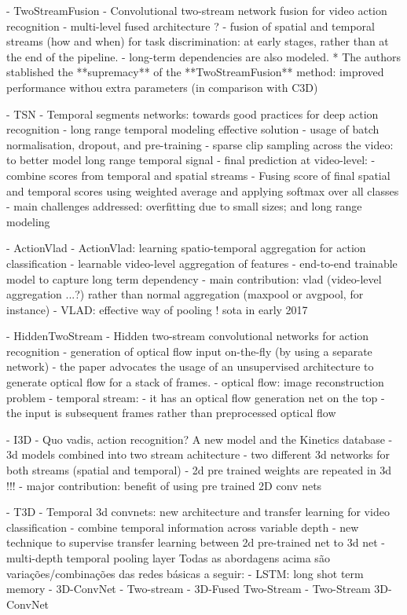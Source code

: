   - TwoStreamFusion
    - Convolutional two-stream network fusion for video action recognition
      - multi-level fused architecture ?
      - fusion of spatial and temporal streams (how and when) for task discrimination: at early stages, rather than at the end of the pipeline.
      - long-term dependencies are also modeled.
      * The authors stablished the **supremacy** of the **TwoStreamFusion** method: improved performance withou extra parameters (in comparison with C3D)

  - TSN
    - Temporal segments networks: towards good practices for deep action recognition
      - long range temporal modeling effective solution
      - usage of batch normalisation, dropout, and pre-training
      - sparse clip sampling across the video: to better model long range temporal signal
      - final prediction at video-level: 
        - combine scores from temporal and spatial streams
        - Fusing score of final spatial and temporal scores using weighted average and applying softmax over all classes
      - main challenges addressed: overfitting due to small sizes; and long range modeling

  - ActionVlad
    - ActionVlad: learning spatio-temporal aggregation for action classification
      - learnable video-level aggregation of features
      - end-to-end trainable model to capture long term dependency
      - main contribution: vlad (video-level aggregation ...?) rather than normal aggregation (maxpool or avgpool, for instance)
      - VLAD: effective way of pooling ! sota in early 2017

  - HiddenTwoStream
    - Hidden two-stream convolutional networks for action recognition
      - generation of optical flow input on-the-fly (by using a separate network)
      - the paper advocates the usage of an unsupervised architecture to generate optical flow for a stack of frames.
      - optical flow: image reconstruction problem
      - temporal stream:
        - it has an optical flow generation net on the top
        - the input is subsequent frames rather than preprocessed optical flow
      
  - I3D
    - Quo vadis, action recognition? A new model and the Kinetics database
      - 3d models combined into two stream achitecture 
      - two different 3d networks for both streams (spatial and temporal)
      - 2d pre trained weights are repeated in 3d !!!
      - major contribution: benefit of using pre trained 2D conv nets

  - T3D
    - Temporal 3d convnets: new architecture and transfer learning for video classification
      - combine temporal information across variable depth
      - new technique to supervise transfer learning between 2d pre-trained net to 3d net
      - multi-depth temporal pooling layer
Todas as abordagens acima são variações/combinações das redes básicas a seguir:
  - LSTM: long shot term memory
  - 3D-ConvNet
  - Two-stream
  - 3D-Fused Two-Stream
  - Two-Stream 3D-ConvNet



